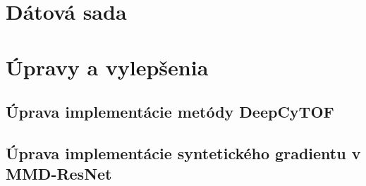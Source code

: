 \section{Dátová sada}

\section{Úpravy a vylepšenia}

\subsection{Úprava implementácie metódy DeepCyTOF}

\subsection{Úprava implementácie syntetického gradientu v MMD-ResNet}